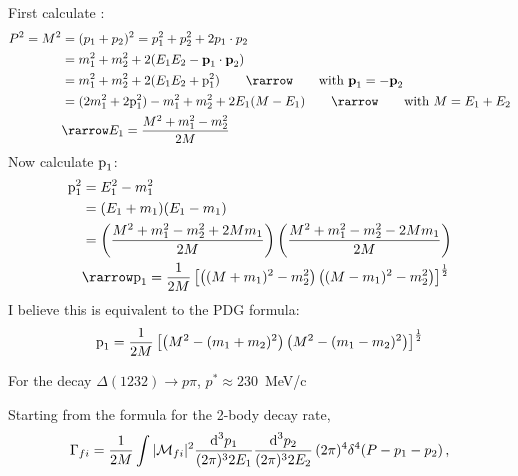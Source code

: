 \begin{solution}
    First calculate \eb:
    \begin{align*}
        P^2 = \ma^2 & = (\pb + \pc)^2 = \pb^2 + \pc^2 + 2\pb\cdot \pc                                                              \\
                    & = \mb^2 + \mc^2 + 2(\eb \ec - \pvecb\cdot \pvecc)                                                            \\
                    & = \mb^2 + \mc^2 + 2(\eb \ec + \pmodvecb^2) \qquad \rarrow \qquad \text{with }\pvecb = -\pvecc                \\
                    & = (2\mb^2 + 2\pmodvecb^2) - \mb^2 + \mc^2 + 2\eb(\ma-\eb) \qquad \rarrow \qquad \text{with } \ma = \eb + \ec \\
                    & \rarrow \eb = \frac{\ma^2 + \mb^2 - \mc^2}{2\ma}
    \end{align*}
    Now calculate $\text{p}_1$:
    \begin{align*}
        \pmodvecb^2 & = \eb^2 - \mb^2                                                                                                      \\
                    & = (\eb + \mb)(\eb - \mb)                                                                                             \\
                    & = \left(\frac{\ma^2 + \mb^2 - \mc^2 + 2\ma\mb}{2\ma}\right)\left(\frac{\ma^2 + \mb^2 - \mc^2 - 2\ma\mb}{2\ma}\right) \\
                    & \rarrow \pmodvecb = \frac{1}{2\ma}
        \left[ \left( (\ma+\mb)^2 - \mc^2 \right)
            \left( (\ma-\mb)^2 - \mc^2 \right)  \right ]^{\frac{1}{2}}
    \end{align*}
    I believe this is equivalent to the PDG formula:
    \begin{align*}
        \text{p}_1 = \frac{1}{2M}
        \left[ \left( M^2 - (m_1+m_2)^2 \right)
            \left( M^2 - (m_1-m_2)^2 \right)  \right ]^{\frac{1}{2}}
    \end{align*}

    For the decay $\Delta(1232)\to p\pi$, $p^* \approx 230$~MeV/c

\end{solution}


\item Starting from the formula for the 2-body decay rate,
\begin{align*}
    \Gamma_{fi} = \frac{1}{2M} \int |\mathcal{M}_{fi}|^2
    \frac{\text{d}^3p_1}{(2\pi)^3 2E_1}
    \frac{\text{d}^3p_2}{(2\pi)^3 2E_2}\,
    (2\pi)^4 \delta^4(P - p_1 - p_2 )\,,
\end{align*}

